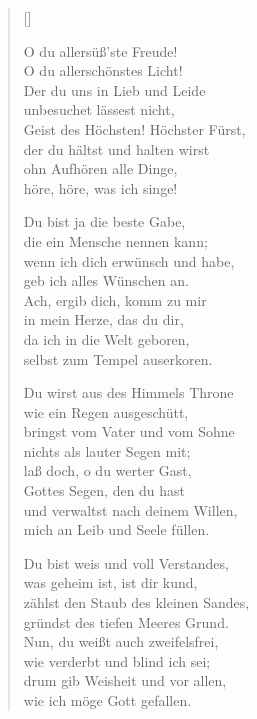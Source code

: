 \begin{multicols}{2}
\settowidth{\versewidth}{Du wirst aus des Himmels Throne}
\begin{verse}[\versewidth]

 O du allersüß'ste Freude!\\
O du allerschönstes Licht!\\
Der du uns in Lieb und Leide\\
unbesuchet lässest nicht,\\
Geist des Höchsten! Höchster Fürst,\\
der du hältst und halten wirst\\
ohn Aufhören alle Dinge,\\
höre, höre, was ich singe!

 Du bist ja die beste Gabe,\\
die ein Mensche nennen kann;\\
wenn ich dich erwünsch und habe,\\
geb ich alles Wünschen an.\\
Ach, ergib dich, komm zu mir\\
in mein Herze, das du dir,\\
da ich in die Welt geboren,\\
selbst zum Tempel auserkoren.

 Du wirst aus des Himmels Throne\\
wie ein Regen ausgeschütt,\\
bringst vom Vater und vom Sohne\\
nichts als lauter Segen mit;\\
laß doch, o du werter Gast,\\
Gottes Segen, den du hast\\
und verwaltst nach deinem Willen,\\
mich an Leib und Seele füllen.

 Du bist weis und voll Verstandes,\\
was geheim ist, ist dir kund,\\
zählst den Staub des kleinen Sandes,\\
gründst des tiefen Meeres Grund.\\
Nun, du weißt auch zweifelsfrei,\\
wie verderbt und blind ich sei;\\
drum gib Weisheit und vor allen,\\
wie ich möge Gott gefallen.


\end{verse}
\end{multicols}
